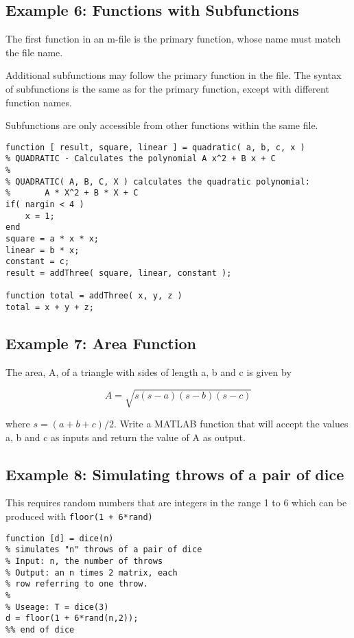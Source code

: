 \documentclass[a4paper,12pt]{article}
\begin{document}
\subsection{Example 6: Functions with Subfunctions}


The first function in an m-file is the primary function, whose name must match the file name.

Additional subfunctions may follow the primary function in the file. The syntax of subfunctions is the same as for the primary function, except with different function names.

Subfunctions are only accessible from other functions within the same file.
\begin{framed}
\begin{verbatim}
function [ result, square, linear ] = quadratic( a, b, c, x )
% QUADRATIC - Calculates the polynomial A x^2 + B x + C
%
% QUADRATIC( A, B, C, X ) calculates the quadratic polynomial:
%       A * X^2 + B * X + C
if( nargin < 4 )
    x = 1;
end
square = a * x * x;
linear = b * x;
constant = c;
result = addThree( square, linear, constant );

function total = addThree( x, y, z )
total = x + y + z;

\end{verbatim}
\end{framed}


\subsection{Example 7: Area Function}
The area, A, of a triangle with sides of length a, b and c is given by

\[A =\sqrt{s(s − a)(s − b)(s − c)}\]

where $s = (a+b+c)/2$. Write a MATLAB function
that will accept the values a, b and c as inputs
and return the value of A as output.


\subsection{Example 8: Simulating throws of a pair of dice}
This requires random numbers that are integers
in the range 1 to 6 which can be produced with
\texttt{floor(1 + 6*rand)}

\begin{framed}
\begin{verbatim}
function [d] = dice(n)
% simulates "n" throws of a pair of dice
% Input: n, the number of throws
% Output: an n times 2 matrix, each
% row referring to one throw.
%
% Useage: T = dice(3)
d = floor(1 + 6*rand(n,2));
%% end of dice
\end{verbatim}
\end{framed}
\end{document}

